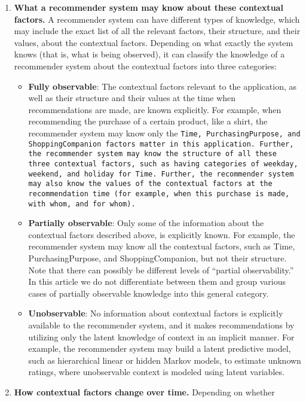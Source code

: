 \begin{enumerate}
\item \textbf{What a recommender system may know about these contextual factors.} 
A recommender system can have different types of knowledge, which may include 
the exact list of all the relevant factors, their structure, and their values, 
about the contextual factors. Depending on what exactly the system knows (that 
is, what is being observed), it can classify the knowledge of a recommender 
system about the contextual factors into three categories: 
	\begin{itemize}
	\item \textbf{Fully observable}: The contextual factors relevant to the 
	application, as well as their structure and their values at the time when 
	recommendations are made, are known explicitly. For example, when
	recommending the purchase of a certain product, like a shirt, the 
	recommender system may know only the \tt{Time}, PurchasingPurpose, and  %
	ShoppingCompanion factors matter in this application. Further, the 
	recommender system may know the structure of all these three contextual 
	factors, such as having categories of weekday, weekend, and holiday for 
	Time. Further, the recommender system may also know the values of the 
	contextual factors at the recommendation time (for example, when this 
	purchase is made, with whom, and for whom).
	\item \textbf{Partially observable}: Only some of the information about 
	the contextual factors described above, is explicitly known. For example, 
	the recommender system may know all the contextual factors, such as Time, 
	PurchasingPurpose, and ShoppingCompanion, but not their structure. Note that 
	there can possibly be different levels of “partial observability.” In this 
	article we do not differentiate between them and group various cases of 
	partially observable knowledge into this general category.
	\item \textbf{Unobservable}: No information about contextual factors is 
	explicitly available to the recommender system, and it makes recommendations 
	by utilizing only the latent knowledge of context in an implicit manner. 
	For example, the recommender system may build a latent predictive model, 
	such as hierarchical linear or hidden Markov models, to estimate unknown 
	ratings, where unobservable context is modeled using latent variables.
	\end{itemize}
\item \textbf{How contextual factors change over time.} Depending on whether 

\end{enumerate}
